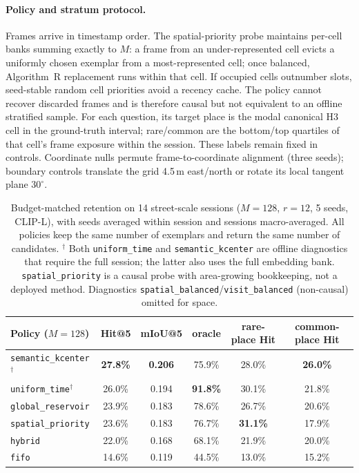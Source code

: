 \paragraph{Policy and stratum protocol.}
Frames arrive in timestamp order. The spatial-priority probe maintains per-cell
banks summing exactly to $M$: a frame from an under-represented cell evicts a
uniformly chosen exemplar from a most-represented cell; once balanced, Algorithm~R
replacement runs within that cell. If occupied cells outnumber slots, seed-stable
random cell priorities avoid a recency cache. The policy cannot recover discarded
frames and is therefore causal but not equivalent to an offline stratified sample.
For each question, its target place is the modal canonical H3 cell in the
ground-truth interval; rare/common are the bottom/top quartiles of that cell's frame
exposure within the session. These labels remain fixed in controls. Coordinate
nulls permute frame-to-coordinate alignment (three seeds); boundary controls
translate the grid 4.5\,m east/north or rotate its local tangent plane $30^\circ$.

\begin{table}[t]
\centering
\begin{tabular}{lccccc}
\toprule
Policy ($M{=}128$) & Hit@5 & mIoU@5 & oracle & rare-place Hit & common-place Hit \\
\midrule
\texttt{semantic\_kcenter}$^\dagger$ & \textbf{27.8\%} & \textbf{0.206} & 75.9\% & 28.0\% & \textbf{26.0\%} \\
\texttt{uniform\_time}$^\dagger$ & 26.0\% & 0.194 & \textbf{91.8\%} & 30.1\% & 21.8\% \\
\texttt{global\_reservoir}  & 23.9\% & 0.183 & 78.6\% & 26.7\% & 20.6\% \\
\texttt{spatial\_priority}  & 23.6\% & 0.183 & 76.7\% & \textbf{31.1\%} & 17.9\% \\
\texttt{hybrid}             & 22.0\% & 0.168 & 68.1\% & 21.9\% & 20.0\% \\
\texttt{fifo}               & 14.6\% & 0.119 & 44.5\% & 13.0\% & 15.2\% \\
\bottomrule
\end{tabular}
\caption{Budget-matched retention on 14 street-scale sessions ($M{=}128$, $r{=}12$,
5 seeds, CLIP-L), with seeds averaged within session and sessions macro-averaged.
All policies keep the same number of exemplars and
return the same number of candidates. $^\dagger$ Both \texttt{uniform\_time} and
\texttt{semantic\_kcenter} are offline diagnostics that require the full session;
the latter also uses the full embedding bank.
\texttt{spatial\_priority} is a causal probe with area-growing bookkeeping, not a
deployed method. Diagnostics \texttt{spatial\_balanced}/\texttt{visit\_balanced}
(non-causal) omitted for space.}
\label{tab:fixed-budget}
\end{table}


